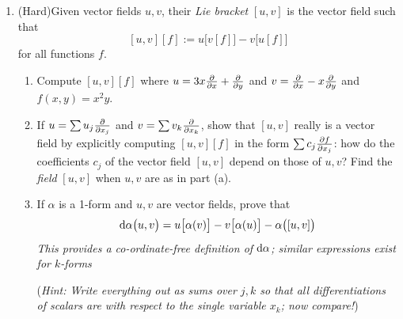 \begin{exercises}
\begin{enumerate}
		
		\item\label{exs:liebracketdalpha} (Hard)\lstsp Given vector fields $u,v$, their \emph{Lie bracket} $[u,v]$ is the vector field such that
		\[
			[u,v][f]:=u\bigl[v[f]\bigr] -v\bigl[u[f]\bigr]
		\]
		for all functions $f$.
		\begin{enumerate}
		  \item Compute $[u,v][f]$ where $u=3x\partials x+\partials y$ and $v=\partials x-x\partials y$ and $f(x,y)=x^2y$.
		  
		  \item If $u=\sum u_j\partials{x_j}$ and $v=\sum v_k\partials{x_k}$, show that $[u,v]$ really is a vector field by explicitly computing $[u,v][f]$ in the form $\sum c_j\partials[f]{x_j}$: how do the coefficients $c_j$ of the vector field $[u,v]$ depend on those of $u,v$? Find the \emph{field} $[u,v]$ when $u,v$ are as in part (a).
		  
		  \item If $\alpha$ is a 1-form and $u,v$ are vector fields, prove that
		  \[
		  	\D\alpha\bigl(u,v\bigr)=u\bigl[\alpha(v)\bigr]-v\bigl[\alpha(u)\bigr]-\alpha\bigl([u,v]\bigl)
		  \]
		  \emph{This provides a co-ordinate-free definition of $\D\alpha$; similar expressions exist for $k$-forms}\par
		  (\emph{Hint: Write everything out as sums over $j,k$ so that all differentiations of scalars are with respect to the single variable $x_k$; now compare!})
		\end{enumerate}
		
	\end{enumerate}
\end{exercises}

